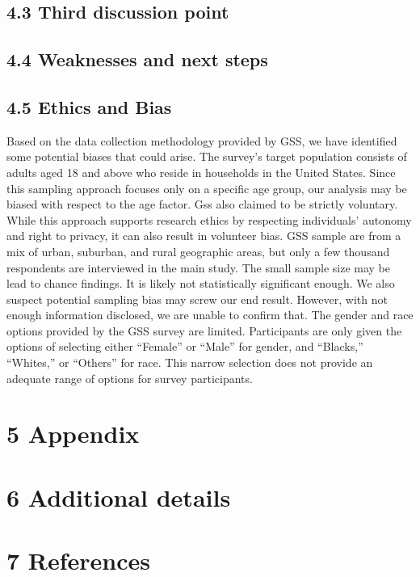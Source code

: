 \documentclass[
  letterpaper,
  DIV=11,
  numbers=noendperiod]{scrartcl}
\begin{document}
\hypertarget{sec-third-point}{%
\subsection{4.3 Third discussion point}\label{sec-third-point}}

\hypertarget{sec-weaknesses}{%
\subsection{4.4 Weaknesses and next steps}\label{sec-weaknesses}}

\hypertarget{sec-bias}{%
\subsection{4.5 Ethics and Bias}\label{sec-bias}}

Based on the data collection methodology provided by GSS, we have
identified some potential biases that could arise. The survey's target
population consists of adults aged 18 and above who reside in households
in the United States. Since this sampling approach focuses only on a
specific age group, our analysis may be biased with respect to the age
factor. Gss also claimed to be strictly voluntary. While this approach
supports research ethics by respecting individuals' autonomy and right
to privacy, it can also result in volunteer bias. GSS sample are from a
mix of urban, suburban, and rural geographic areas, but only a few
thousand respondents are interviewed in the main study. The small sample
size may be lead to chance findings. It is likely not statistically
significant enough. We also suspect potential sampling bias may screw
our end result. However, with not enough information disclosed, we are
unable to confirm that. The gender and race options provided by the GSS
survey are limited. Participants are only given the options of selecting
either ``Female'' or ``Male'' for gender, and ``Blacks,'' ``Whites,'' or
``Others'' for race. This narrow selection does not provide an adequate
range of options for survey participants.

\hypertarget{appendix}{%
\section*{5 Appendix}\label{appendix}}

\hypertarget{additional-details}{%
\section{6 Additional details}\label{additional-details}}

\hypertarget{references}{%
\section{7 References}\label{references}}
\end{document}
